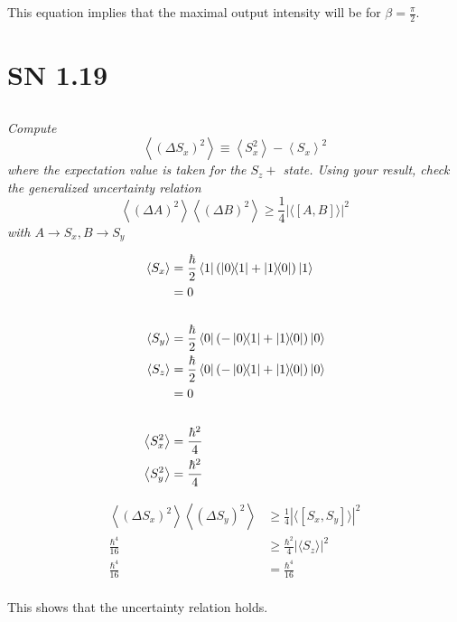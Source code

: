 \documentclass{article}
\begin{document}
This equation implies that the maximal output intensity will be for $\beta = \frac{\pi}{2}$.

\newpage

\section{SN 1.19}


\subsection{}
\textit{Compute
$$
\left\langle\left(\Delta S_{x}\right)^{2}\right\rangle \equiv\left\langle S_{x}^{2}\right\rangle-\left\langle S_{x}\right\rangle^{2}
$$
where the expectation value is taken for the $S_{z}+$ state. Using your result, check the generalized uncertainty relation
$$
\left\langle(\Delta A)^{2}\right\rangle\left\langle(\Delta B)^{2}\right\rangle \geq \frac{1}{4}|\langle[A, B]\rangle|^{2}
$$
with $A \rightarrow S_{x}, B \rightarrow S_{y}$}


\begin{align*}
    \left\langle S_{x}\right\rangle&=\frac{\hbar}{2}\bra{1}(\ketbra{0}{1}+\ketbra{1}{0})\ket{1}\\
    &= 0\\
    &\\ 
    \left\langle S_{y}\right\rangle&=\frac{\hbar}{2}\bra{0}(-\ketbra{0}{1}+\ketbra{1}{0})\ket{0}\\
    \left\langle S_{z}\right\rangle&=\frac{\hbar}{2}\bra{0}(-\ketbra{0}{1}+\ketbra{1}{0})\ket{0}\\
    &= 0\\
    &\\
    \left\langle S_{x}^{2}\right\rangle &= \frac{\hbar^2}{4}\\
    \left\langle S_{y}^{2}\right\rangle &= \frac{\hbar^2}{4}\\
\end{align*}

\begin{align*}
\left\langle(\Delta  S_{x})^{2}\right\rangle\left\langle(\Delta  S_{y})^{2}\right\rangle &\geq \frac{1}{4}|\langle[ S_{x},  S_{y}]\rangle|^{2}\\
\frac{\hbar^4}{16} &\geq \frac{\hbar^2}{4} |\langle S_{z}\rangle|^{2}\\
\frac{\hbar^4}{16} &= \frac{\hbar^4}{16} \\
\end{align*}

This shows that the uncertainty relation holds. 
\end{document}

